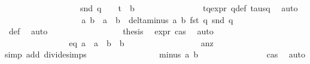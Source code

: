 \begin{isabellebody}
\ \ \ \ \ \ \ \ \ \ \ \ \ \ \ \ \ \ {\isachardoublequoteopen}{\isacharparenleft}snd\ q{\isacharparenright}\ {\isacharequal}\ {\isacharparenleft}{}\ {\isacharslash}\ {\isacharparenleft}t\ {\isacharasterisk}\ b{}{\isacharparenright}{\isacharparenright}{\isachardoublequoteclose}\isanewline
\ \ \ \ \ \ \ \ \ \ \ \ \ \ \isamarkupfalse%
\ tq{\isacharunderscore}expr\ q{\isacharunderscore}def\ tau{\isacharunderscore}sq\ \isamarkupfalse%
\ auto\isanewline
\ \ \ \ \ \ \ \ \ \ \ \ \ \ \isamarkupfalse%
\ \isamarkupfalse%
\ {\isachardoublequoteopen}{\isasymdelta}{\isacharprime}\ a{}\ b{}\ {\isacharequal}\ a{}\ {\isacharasterisk}\ b{}\ {\isacharasterisk}\ delta{\isacharunderscore}minus\ a{}\ b{}\ {\isacharparenleft}fst\ q{\isacharparenright}\ {\isacharparenleft}snd\ q{\isacharparenright}{\isachardoublequoteclose}\isanewline
\ \ \ \ \ \ \ \ \ \ \ \ \ \ \ \ \isamarkupfalse%
\ {\isasymdelta}{\isacharprime}{\isacharunderscore}def\ \isamarkupfalse%
\ auto\isanewline
\ \ \ \ \ \ \ \ \ \ \ \ \ \ \isamarkupfalse%
\ \isamarkupfalse%
\ {\isacharquery}thesis\ \isamarkupfalse%
\ {\isasymdelta}{\isacharprime}{\isacharunderscore}expr\ cas{}\ \isamarkupfalse%
\ auto\ \isanewline
\ \ \ \ \ \ \ \ \ \ \ \ \isamarkupfalse%
\isanewline
\ \ \ \ \ \ \ \ \ \ \ \ \isamarkupfalse%
\ \isamarkupfalse%
\ eq{}{\isacharcolon}\ {\isachardoublequoteopen}a{}\ {\isacharequal}\ a{}\ {\isacharasterisk}\ {\isacharparenleft}b{}\ {\isacharslash}\ b{}{\isacharparenright}{\isachardoublequoteclose}\ \ \isanewline
\ \ \ \ \ \ \ \ \ \ \ \ \ \ \isamarkupfalse%
\ a{}{\isacharunderscore}nz{\isacharparenleft}{}{\isacharparenright}\ \isamarkupfalse%
{\isacharparenleft}simp\ add{\isacharcolon}\ divide{\isacharunderscore}simps{\isacharparenright}\ \isanewline
\isanewline
\ \ \ \ \ \ \ \ \ \ \ \ \isamarkupfalse%
\ {\isachardoublequoteopen}{}\ {\isacharequal}\ {\isasymdelta}{\isacharunderscore}minus\ a{}\ b{}{\isachardoublequoteclose}\isanewline
\ \ \ \ \ \ \ \ \ \ \ \ \ \ \isamarkupfalse%
\ cas{}\ \isamarkupfalse%
\ auto\isanewline
\ \ \ \ \ \ \ \ \ \ \ \ \isamarkupfalse%

\end{isabellebody}
